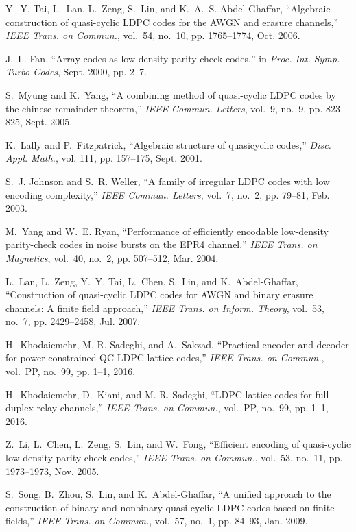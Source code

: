 \documentclass[journal,draftclsnofoot,onecolumn,12pt,twoside]{IEEEtran}
\begin{document}
\begin{thebibliography}{10}
Y.~Y. Tai, L.~Lan, L.~Zeng, S.~Lin, and K.~A.~S. Abdel-Ghaffar, ``Algebraic
  construction of quasi-cyclic \textsc{LDPC} codes for the \textsc{AWGN} and
  erasure channels,'' \emph{IEEE Trans. on Commun.}, vol.~54, no.~10, pp.
  1765--1774, Oct. 2006.

J.~L. Fan, ``Array codes as low-density parity-check codes,'' in \emph{Proc.
  Int. Symp. Turbo Codes}, Sept. 2000, pp. 2--7.

S.~Myung and K.~Yang, ``A combining method of quasi-cyclic \textsc{LDPC} codes
  by the chinese remainder theorem,'' \emph{IEEE Commun. Letters}, vol.~9,
  no.~9, pp. 823--825, Sept. 2005.

K.~Lally and P.~Fitzpatrick, ``Algebraic structure of quasicyclic codes,''
  \emph{Disc. Appl. Math.}, vol. 111, pp. 157--175, Sept. 2001.

S.~J. Johnson and S.~R. Weller, ``A family of irregular \textsc{LDPC} codes
  with low encoding complexity,'' \emph{IEEE Commun. Letters}, vol.~7, no.~2,
  pp. 79--81, Feb. 2003.

M.~Yang and W.~E. Ryan, ``Performance of efficiently encodable low-density
  parity-check codes in noise bursts on the \textsc{EPR4} channel,'' \emph{IEEE
  Trans. on Magnetics}, vol.~40, no.~2, pp. 507--512, Mar. 2004.

L.~Lan, L.~Zeng, Y.~Y. Tai, L.~Chen, S.~Lin, and K.~Abdel-Ghaffar,
  ``Construction of quasi-cyclic \textsc{LDPC} codes for \textsc{AWGN} and
  binary erasure channels: A finite field approach,'' \emph{IEEE Trans. on
  Inform. Theory}, vol.~53, no.~7, pp. 2429--2458, Jul. 2007.

H.~Khodaiemehr, M.-R. Sadeghi, and A.~Sakzad, ``Practical encoder and decoder
  for power constrained \textsc{QC LDPC}-lattice codes,'' \emph{IEEE Trans. on
  Commun.}, vol.~PP, no.~99, pp. 1--1, 2016.

H.~Khodaiemehr, D.~Kiani, and M.-R. Sadeghi, ``\textsc{LDPC} lattice codes for
  full-duplex relay channels,'' \emph{IEEE Trans. on Commun.}, vol.~PP, no.~99,
  pp. 1--1, 2016.

Z.~Li, L.~Chen, L.~Zeng, S.~Lin, and W.~Fong, ``Efficient encoding of
  quasi-cyclic low-density parity-check codes,'' \emph{IEEE Trans. on Commun.},
  vol.~53, no.~11, pp. 1973--1973, Nov. 2005.

S.~Song, B.~Zhou, S.~Lin, and K.~Abdel-Ghaffar, ``A unified approach to the
  construction of binary and nonbinary quasi-cyclic \textsc{LDPC} codes based
  on finite fields,'' \emph{IEEE Trans. on Commun.}, vol.~57, no.~1, pp.
  84--93, Jan. 2009.


\end{thebibliography}
\end{document}
